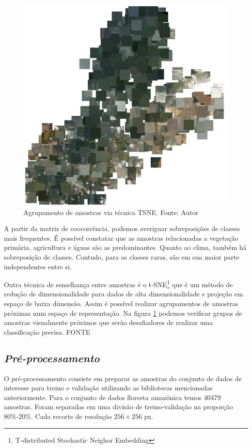 \begin{figure}[!ht]
    \centering
    \includegraphics[width=0.9\columnwidth]{Imagens/results/EDA/TSNE.png}
    \caption{Agrupamento de amostras via técnica TSNE.
    Fonte: Autor}
   \label{fig:TSNE}
\end{figure}

A partir da matriz de coocorrência, podemos averiguar sobreposições de classes mais frequentes. É possível constatar que as amostras relacionadas a vegetação primária, agricultura e águas são as predominantes. Quanto ao clima, também há sobreposição de classes. Contudo, para as classes raras, são em sua maior parte independentes entre si.

Outra técnica de semelhança entre amostras é o t-SNE\footnote[5]{T-distributed Stochastic Neighor Embedding} que é um método de redução de dimensionalidade para dados de alta dimensionalidade e projeção em espaço de baixa dimensão. Assim é possível realizar agrupamentos de amostras próximas num espaço de representação. Na figura \ref{fig:TSNE} podemos verificar grupos de amostras visualmente próximos que serão desafiadores de realizar uma classificação precisa. FONTE


\subsection{\textit{Pré-processamento}}\label{sec:Cap3_PreProcess}
O pré-processamento consiste em preparar as amostras do conjunto de dados de interesse para treino e validação utilizando as bibliotecas mencionadas anteriormente. Para o conjunto de dados floresta amazônica temos 40479 amostras. Foram separadas em uma divisão de treino-validação na proporção 80\%-20\%. Cada recorte de resolução $256 \times 256$ px.

